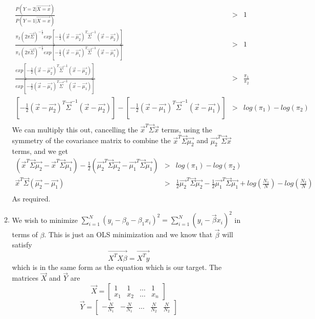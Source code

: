 \documentclass{article}
\begin{document}
\begin{enumerate}
\begin{enumerate}
      \begin{eqnarray*}
        \frac{P(Y=2|\vec{X=x})}{P(Y=1|\vec{X=x})} &>& 1 \\
        \frac{\pi_2(2\pi\vec{\Sigma})^{-\frac{1}{2}}exp\left[-\frac{1}{2}(\vec{x}-\vec{\mu_2})^T\vec{\Sigma}^{-1}(\vec{x}-\vec{\mu_2})\right]}{\pi_1(2\pi\vec{\Sigma})^{-\frac{1}{2}}exp\left[-\frac{1}{2}(\vec{x}-\vec{\mu_1})^T\vec{\Sigma}^{-1}(\vec{x}-\vec{\mu_1})\right]} &>& 1 \\
        \frac{exp\left[-\frac{1}{2}(\vec{x}-\vec{\mu_2})^T\vec{\Sigma}^{-1}(\vec{x}-\vec{\mu_2})\right]}{exp\left[-\frac{1}{2}(\vec{x}-\vec{\mu_1})^T\vec{\Sigma}^{-1}(\vec{x}-\vec{\mu_1})\right]} &>& \frac{\pi_1}{\pi_2} \\
        \left[-\frac{1}{2}(\vec{x}-\vec{\mu_2})^T\vec{\Sigma}^{-1}(\vec{x}-\vec{\mu_2})\right] - \left[-\frac{1}{2}(\vec{x}-\vec{\mu_1})^T\vec{\Sigma}^{-1}(\vec{x}-\vec{\mu_1})\right] &>& log(\pi_1) - log(\pi_2) \\
      \end{eqnarray*}
      We can multiply this out, cancelling the $\vec{x}^T\vec{\Sigma}\vec{x}$ terms, using the symmetry of the covariance matrix to combine the $\vec{x}^T\vec{\Sigma}\vec{\mu_2}$ and $\vec{\mu_2}^T\vec{\Sigma}\vec{x}$ terms, and we get
      \begin{eqnarray*}
        \left(\vec{x}^T\vec{\Sigma}\vec{\mu_2} - \vec{x}^T\vec{\Sigma}\vec{\mu_1}\right) -\frac{1}{2}\left(\vec{\mu_2}^T\vec{\Sigma}\vec{\mu_2} - \vec{\mu_1}^T\vec{\Sigma}\vec{\mu_1}\right)  &>& log(\pi_1) - log(\pi_2) \\
        \vec{x}^T\vec{\Sigma}\left(\vec{\mu_2} - \vec{\mu_1}\right) &>& \frac{1}{2}\vec{\mu_2}^T\vec{\Sigma}\vec{\mu_2} - \frac{1}{2}\vec{\mu_1}^T\vec{\Sigma}\vec{\mu_1} + log\left(\frac{N_1}{N}\right) - log\left(\frac{N_2}{N}\right) \\
      \end{eqnarray*}
      As required.
    \item We wish to minimize $\sum\limits_{i=1}^{N}(y_i - \beta_0 - \beta_1 x_i)^2 = \sum\limits_{i=1}^{N}(y_i - \vec{\beta}x_i)^2$ in terms of $\beta$. This is just an OLS minimization and we know that $\vec{\beta}$ will satisfy
    $$ \vec{X^TX\beta} = \vec{X^Ty} $$
    which is in the same form as the equation which is our target. The matrices $\vec{X}$ and $\vec{Y}$ are 
    $$ \vec{X} = \left[
        \begin{matrix}
          1 & 1 & \ldots & 1 \\
          x_1 & x_2 & \ldots & x_n
        \end{matrix}
      \right]
   $$
   $$
      \vec{Y} = \left[
        \begin{matrix}
          -\frac{N}{N_1} & -\frac{N}{N_1} & \ldots & \frac{N}{N_2} & \frac{N}{N_2}
        \end{matrix}
      \right]
   $$
    \end{enumerate}
\end{enumerate}
\end{document}
